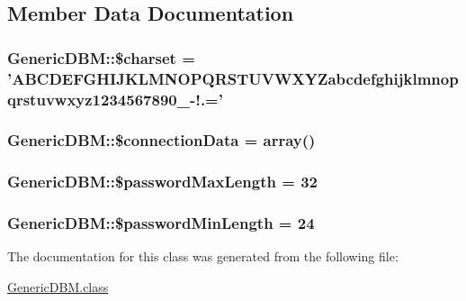 \subsection{Member Data Documentation}
\hypertarget{classGenericDBM_ad63981b6ff22900da89b1e880a5a1420}{
\subsubsection[{\$charset}]{\setlength{\rightskip}{0pt plus 5cm}Generic\-D\-B\-M\-::\$charset = 'A\-B\-C\-D\-E\-F\-G\-H\-I\-J\-K\-L\-M\-N\-O\-P\-Q\-R\-S\-T\-U\-V\-W\-X\-Y\-Zabcdefghijklmnopqrstuvwxyz1234567890\-\_\--\/!.='\hspace{0.3cm}{\ttfamily [private]}}}\label{classGenericDBM_ad63981b6ff22900da89b1e880a5a1420}
\hypertarget{classGenericDBM_ac71262dc922fc26058b54ec18d900a1e}{
\subsubsection[{\$connection\-Data}]{\setlength{\rightskip}{0pt plus 5cm}Generic\-D\-B\-M\-::\$connection\-Data = array()\hspace{0.3cm}{\ttfamily [private]}}}\label{classGenericDBM_ac71262dc922fc26058b54ec18d900a1e}
\hypertarget{classGenericDBM_abbad97a2774e974cc2b47741ca50a619}{
\subsubsection[{\$password\-Max\-Length}]{\setlength{\rightskip}{0pt plus 5cm}Generic\-D\-B\-M\-::\$password\-Max\-Length = 32\hspace{0.3cm}{\ttfamily [private]}}}\label{classGenericDBM_abbad97a2774e974cc2b47741ca50a619}
\hypertarget{classGenericDBM_a072e4cac6e6f77ce456ce0396e5b11dd}{
\subsubsection[{\$password\-Min\-Length}]{\setlength{\rightskip}{0pt plus 5cm}Generic\-D\-B\-M\-::\$password\-Min\-Length = 24\hspace{0.3cm}{\ttfamily [private]}}}\label{classGenericDBM_a072e4cac6e6f77ce456ce0396e5b11dd}


The documentation for this class was generated from the following file\-:\begin{DoxyCompactItemize}
\item 
\hyperlink{GenericDBM_8class}{Generic\-D\-B\-M.\-class}\end{DoxyCompactItemize}
